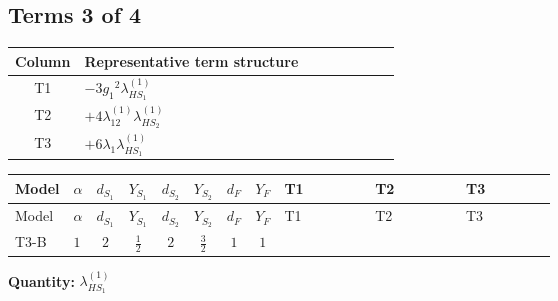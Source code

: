 \documentclass[8pt]{article}
\begin{document}
\begin{landscape}
\subsection*{Terms 3 of 4}
\begin{center}
\begin{tabular}{@{}c >{\raggedright\arraybackslash}p{0.82\linewidth}@{}}
\toprule
Column & Representative term structure \\
\midrule
T1 & \(\displaystyle -3 {g_1}^2 {\lambda_{HS_1}^{(1)}}\) \\
\midrule
T2 & \(\displaystyle +4 {\lambda_{12}^{(1)}} {\lambda_{HS_2}^{(1)}}\) \\
\midrule
T3 & \(\displaystyle +6 {\lambda_1} {\lambda_{HS_1}^{(1)}}\) \\
\midrule
\bottomrule
\end{tabular}
\end{center}
\smallskip
\tiny
\begin{longtable}{@{}llcccccc >{\raggedright\arraybackslash}p{0.21\linewidth} >{\raggedright\arraybackslash}p{0.21\linewidth} >{\raggedright\arraybackslash}p{0.21\linewidth}@{}}
\toprule
Model & $\alpha$ & $d_{S_1}$ & $Y_{S_1}$ & $d_{S_2}$ & $Y_{S_2}$ & $d_F$ & $Y_F$ & T1 & T2 & T3 \\
\midrule
\endfirsthead
\toprule
Model & $\alpha$ & $d_{S_1}$ & $Y_{S_1}$ & $d_{S_2}$ & $Y_{S_2}$ & $d_F$ & $Y_F$ & T1 & T2 & T3 \\
\midrule
\endhead
T3-B & $1$ & $2$ & $\frac{1}{2}$ & $2$ & $\frac{3}{2}$ & $1$ & $1$ & \scriptsize\adjustbox{max width=\linewidth}{$\begin{gathered} -3 {g_1}^2 {\lambda_{HS_1}^{(1)}}\end{gathered}$} & \scriptsize\adjustbox{max width=\linewidth}{$\begin{gathered} +4 {\lambda_{12}^{(1)}} {\lambda_{HS_2}^{(1)}}\end{gathered}$} & \scriptsize\adjustbox{max width=\linewidth}{$\begin{gathered} +6 {\lambda_1} {\lambda_{HS_1}^{(1)}}\end{gathered}$} \\
\midrule
\bottomrule
\end{longtable}
\clearpage
\noindent\textbf{Quantity: }$\lambda_{HS_1}^{(1)}$\par\smallskip

\end{landscape}
\end{document}
